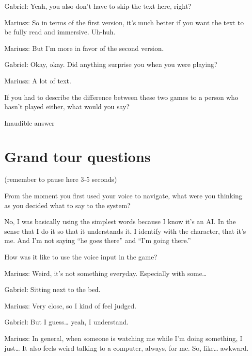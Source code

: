 \begin{QandA}
\begin{answered}
            Gabriel: Yeah, you also don’t have to skip the text here, right?

            Mariusz: So in terms of the first version, it’s much better if you want the text to be fully read and immersive.
            Uh-huh.

            Mariusz: But I’m more in favor of the second version.

            Gabriel: Okay, okay.
            Did anything surprise you when you were playing?

            Mariusz: A lot of text.
            \end{answered}

   \item If you had to describe the difference between these two games to a person who hasn't played either, what would you say?
         \begin{answered}
               Inaudible answer
         \end{answered}
         
\end{QandA}




\section{Grand tour questions}
(remember to pause here 3-5 seconds)

\begin{QandA}


   \item From the moment you first used your voice to navigate, what were you thinking as you decided what to say to the system?

         \begin{answered}
            No, I was basically using the simplest words because I know it’s an AI.
            In the sense that I do it so that it understands it.
            I identify with the character, that it’s me.
            And I’m not saying “he goes there” and “I’m going there.”
         \end{answered}

    \item How was it like to use the voice input in the game?
         \begin{answered}
            Mariusz: Weird, it’s not something everyday.
            Especially with some…

            Gabriel: Sitting next to the bed.

            Mariusz: Very close, so I kind of feel judged.

            Gabriel: But I guess… yeah, I understand.

            Mariusz: In general, when someone is watching me while I’m doing something, I just…
            It also feels weird talking to a computer, always, for me.
            So, like… awkward.
         \end{answered}


\end{QandA}




